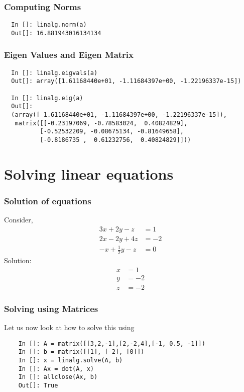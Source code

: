 \documentclass[14pt,compress]{beamer}
\newcommand{\kwrd}[1]{ \texttt{\textbf{\color{blue}{#1}}}  }
\begin{document}
\begin{frame}[fragile]
\frametitle{Computing Norms}
\begin{lstlisting}
  In []: linalg.norm(a)
  Out[]: 16.881943016134134
\end{lstlisting}
\end{frame}

\begin{frame}[fragile]
\frametitle{Eigen Values and Eigen Matrix}
\begin{small}
\begin{lstlisting}
  In []: linalg.eigvals(a)
  Out[]: array([1.61168440e+01, -1.11684397e+00, -1.22196337e-15])

  In []: linalg.eig(a)
  Out[]: 
  (array([ 1.61168440e+01, -1.11684397e+00, -1.22196337e-15]),
   matrix([[-0.23197069, -0.78583024,  0.40824829],
          [-0.52532209, -0.08675134, -0.81649658],
          [-0.8186735 ,  0.61232756,  0.40824829]]))
\end{lstlisting}
\end{small}
\end{frame}

\section{Solving linear equations}

\begin{frame}[fragile]
\frametitle{Solution of equations}
Consider,
  \begin{align*}
    3x + 2y - z  & = 1 \\
    2x - 2y + 4z  & = -2 \\
    -x + \frac{1}{2}y -z & = 0
  \end{align*}
Solution:
  \begin{align*}
    x & = 1 \\
    y & = -2 \\
    z & = -2
  \end{align*}
\end{frame}

\begin{frame}[fragile]
\frametitle{Solving using Matrices}
Let us now look at how to solve this using \kwrd{matrices}
  \begin{lstlisting}
    In []: A = matrix([[3,2,-1],[2,-2,4],[-1, 0.5, -1]])
    In []: b = matrix([[1], [-2], [0]])
    In []: x = linalg.solve(A, b)
    In []: Ax = dot(A, x)
    In []: allclose(Ax, b)
    Out[]: True
  \end{lstlisting}
\end{frame}
\end{document}
